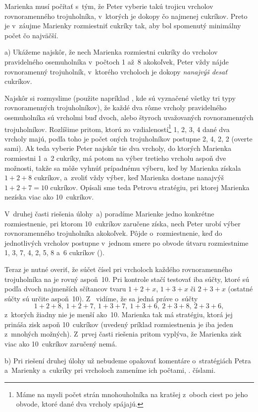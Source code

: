 {%
Marienka musí počítať s~tým, že Peter vyberie takú trojicu vrcholov
rovnoramenného trojuholníka, v~ktorých je dokopy čo najmenej cukríkov.
Preto je v~záujme Marienky rozmiestniť cukríky tak, aby bol spomenutý
minimálny počet čo najväčší.

a) Ukážeme najskôr, že nech Marienka rozmiestni cukríky do vrcholov
pravidelného osemuholníka v~počtoch 1 až~8 akokoľvek, Peter vždy
nájde rovnoramenný trojuholník, v~ktorého vrcholoch je dokopy {\it
nanajvýš desať\/} cukríkov.

Najskôr si rozmyslime (použite napríklad \obr, kde sú vyznačené
všetky tri typy rovnoramenných trojuholníkov), že každé dva
rôzne vrcholy pravidelného osemuholníka sú vrcholmi
buď dvoch, alebo štyroch uvažovaných rovnoramenných trojuholníkov.
Rozlíšime pritom, ktorú zo vzdialeností\footnote{Máme na mysli počet
strán mnohouholníka na kratšej z~oboch ciest po jeho obvode,
ktoré dané dva vrcholy spájajú.} 1, 2, 3, 4 dané dva vrcholy majú,
podľa toho je počet oných trojuholníkov postupne 2, 4, 2, 2 (overte sami).
Ak teda vyberie Peter najskôr tie dva vrcholy,
do ktorých Marienka rozmiestni 1 a~2 cukríky, má potom na výber tretieho
vrcholu aspoň dve možnosti, takže sa môže vyhnúť
prípadnému výberu, keď by Marienka získala $1+2+8$
cukríkov, a~zvoliť vždy výber,
keď Marienka dostane nanajvýš $1+2+7=10$ cukríkov.
Opísali sme teda Petrovu stratégiu,
pri ktorej Marienka nezíska viac ako 10~cukríkov.
%

V~druhej časti riešenia úlohy~a) poradíme Marienke jedno konkrétne
rozmiestnenie, pri ktorom 10~cukríkov zaručene získa, nech Peter urobí
výber rovnoramenného trojuholníka akokoľvek. Pôjde o~rozmiestnenie, keď do
jednotlivých vrcholov postupne v~jednom smere po obvode útvaru
rozmiestnime 1, 3, 7, 4, 2, 5, 8 a~6 cukríkov (\obr).

Teraz je nutné overiť, že súčet čísel pri vrcholoch
každého rovnoramenného trojuholníka na  je rovný aspoň~10.
Pri kontrole stačí testovať iba súčty, ktoré sú
podľa dvoch najmenších sčítancov tvaru $1+2+x$, $1+3+x$ či $2+3+x$
(ostatné súčty sú určite aspoň~10).
Z~ vidíme, že sa jedná práve o~súčty
$$
1+2+8,\ 1+2+7,\ 1+3+7,\ 1+3+6,\ 2+3+8,\ 2+3+6,
$$
z~ktorých žiadny nie je menší ako~10. Marienka tak má stratégiu, ktorá
jej prináša zisk aspoň 10~cukríkov (uvedený príklad rozmiestnenia je iba
jeden z~mnohých možných). Z~prvej časti riešenia pritom vyplýva, že Marienka
zisk viac ako 10~cukríkov zaručený nemá.

\smallskip
b) Pri riešení druhej úlohy už nebudeme opakovať komentáre
o~stratégiách Petra a~Marienky a~cukríky pri vrcholoch zameníme ich
počtami, \tj. číslami.

}
